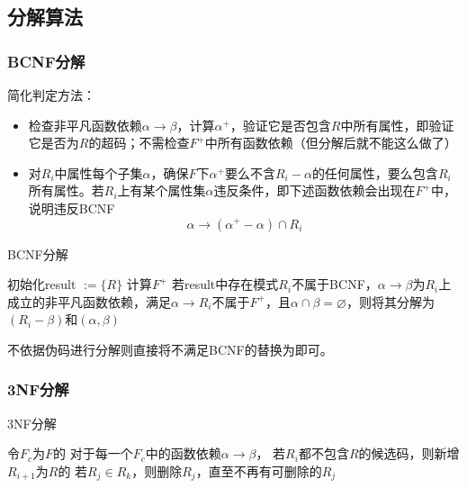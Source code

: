 \subsection{分解算法}
\subsubsection{BCNF分解}
简化判定方法：
\begin{itemize}
	\item 检查非平凡函数依赖$\alpha\to\beta$，计算$\alpha^+$，验证它是否包含$R$中所有属性，即验证它是否为$R$的超码；不需检查$F^+$中所有函数依赖（但分解后就不能这么做了）
	\item 对$R_i$中属性每个子集$\alpha$，确保$F$下$\alpha^+$要么不含$R_i-\alpha$的任何属性，要么包含$R_i$所有属性。若$R_i$上有某个属性集$\alpha$违反条件，即下述函数依赖会出现在$F^+$中，说明违反BCNF
	\[\alpha\to(\alpha^+-\alpha)\cap R_i\]
\end{itemize}
\begin{algorithm}
\caption{BCNF分解}
\begin{algorithmic}[1]
\State 初始化result $:=\{R\}$
\State 计算$F^+$
\State 若result中存在模式$R_i$不属于BCNF，$\alpha\to\beta$为$R_i$上成立的非平凡函数依赖，满足$\alpha\to R_i$不属于$F^+$，且$\alpha\cap\beta=\varnothing$，则将其分解为$(R_i-\beta)$和$(\alpha,\beta)$
\end{algorithmic}
\end{algorithm}

不依据伪码进行分解则直接将不满足BCNF的替换为即可。

\subsubsection{3NF分解}
\begin{algorithm}
\caption{3NF分解}
\begin{algorithmic}[1]
\State 令$F_c$为$F$的
\State 对于每一个$F_c$中的函数依赖$\alpha\to\beta$，
\State 若$R_i$都不包含$R$的候选码，则新增$R_{i+1}$为$R$的
\State 若$R_j\in R_k$，则删除$R_j$，直至不再有可删除的$R_j$
\end{algorithmic}
\end{algorithm}

